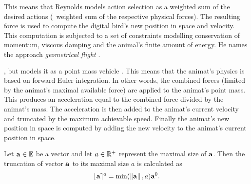 This means that Reynolds models action selection as a weighted sum of the desired actions (\ie\ weighted sum of the respective physical forces). The resulting force is used to compute the digital bird's new position in space and velocity. This computation is subjected to a set of constraints modelling conservation of momentum, viscous damping and the animal's finite amount of energy. He names the approach \emph{geometrical flight} \cite{reynolds:1987}.

, but models it as a point mass vehicle \cite{reynolds:1987,reynolds:1999}. This means that the animat's physics is based on forward Euler integration. In other words, the combined forces (limited by the animat's maximal available force) are applied to the animat's point mass. This produces an acceleration equal to the combined force divided by the animat's mass. The acceleration is then added to the animat's current velocity and truncated by the maximum achievable speed. Finally the animat's new position in space is computed by adding the new velocity to the animat's current position in space.

Let ${\mathbf{a}} \in \mathbb{E}$ be a vector and let $a \in \mathbb{R}^+$ represent the maximal size of ${\mathbf{a}}$. Then the truncation of vector ${\mathbf{a}}$ to its maximal size $a$ is calculated as
%
\begin{equation}
\lfloor{\ensuremath{\mathbf{a}}}\rceil^{a} = \min(\left\|{\mathbf{a}}\right\|, a) {\mathbf{a}}^0. \label{eq:truncation}
\end{equation}

